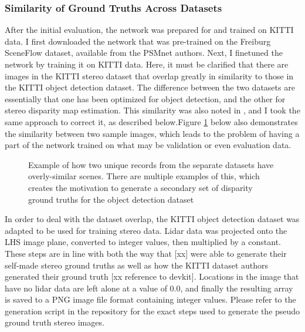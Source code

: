 \subsubsection{Similarity of Ground Truths Across Datasets}
After the initial evaluation, the network was prepared for and trained on KITTI data. I first downloaded the network that was pre-trained on the Freiburg SceneFlow dataset, available from the PSMnet authors. Next, I finetuned the network by training it on KITTI data. Here, it must be clarified that there are images in the KITTI stereo dataset that overlap greatly in similarity to those in the KITTI object detection dataset. The difference between the two datasets are essentially that one has been optimized for object detection, and the other for stereo disparity map estimation. This similarity was also noted in \cite{wang_pseudo-lidar_2019}, and I took the same approach to correct it, as described below.Figure \ref{similarity_stereo_objdet} below also demonstrates the similarity between two sample images, which leads to the problem of having a part of the network trained on what may be validation or even evaluation data.

\begin{figure}[ht]
	\centering
	\caption{Example of how two unique records from the separate datasets have overly-similar scenes. There are multiple examples of this, which creates the motivation to generate a secondary set of disparity ground truths for the object detection dataset}
	\label{similarity_stereo_objdet}
\end{figure}

In order to deal with the dataset overlap, the KITTI object detection dataset was adapted to be used for training stereo data. Lidar data was projected onto the LHS image plane, converted to integer values, then multiplied by a constant. These steps are in line with both the way that [xx] were able to generate their self-made stereo ground truths as well as how the KITTI dataset authors generated their ground truth [xx reference to devkit]. Locations in the image that have no lidar data are left alone at a value of 0.0, and finally the resulting array is saved to a PNG image file format containing integer values. Please refer to the generation script in the repository for the exact steps used to generate the pseudo ground truth stereo images.

